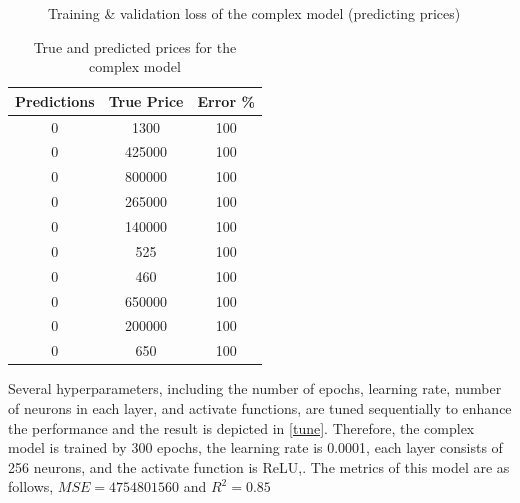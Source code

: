 \documentclass[12pt,twoside]{report}
\begin{document}
\begin{figure}[!htbp]
	\hfil
	\caption{Training \& validation loss of the complex model (predicting prices)}
	\label{all_complex_full_epoch_1000}
\end{figure}

\begin{table}[!htbp]
	\centering
	\caption{ True and predicted prices for the complex model}
	\label{complex_model_prediction_price}
	\begin{tabular}{| c | c | c |}
		\hline
		Predictions & True Price & Error \% \\
		\hline
		0 & 1300 & 100 \\
		\hline
		0 & 425000 & 100 \\
		\hline
		0 & 800000 & 100 \\
		\hline
		0 & 265000 & 100 \\
		\hline
		0 & 140000 & 100 \\
		\hline
		0 & 525 & 100 \\
		\hline
		0 & 460 & 100 \\ 
		\hline
		0 & 650000 & 100 \\
		\hline
		0 & 200000 & 100 \\
		\hline
		0 & 650 & 100 \\
		\hline
	\end{tabular}
\end{table}

Several hyperparameters, including the number of epochs, learning rate, number of neurons in each layer, and activate functions, are tuned sequentially to enhance the performance and the result is depicted in \ref{tune}. Therefore, the complex model is trained by 300 epochs, the learning rate is 0.0001, each layer consists of 256 neurons, and the activate function is ReLU,. The metrics of this model are as follows, $MSE = 4754801560$ and $R^2 = 0.85$
\end{document}
